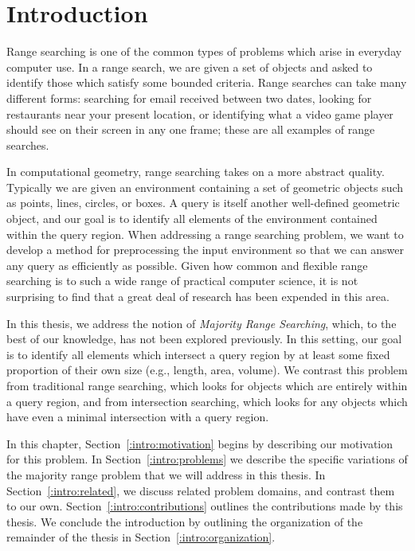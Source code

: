 \chapter{Introduction}
\label{:intro}


Range searching is one of the common types of problems which arise in everyday computer use. In a range search, we are given a set of objects and asked to identify those which satisfy some bounded criteria. Range searches can take many different forms: searching for email received between two dates, looking for restaurants near your present location, or identifying what a video game player should see on their screen in any one frame; these are all examples of range searches.

In computational geometry, range searching takes on a more abstract quality. 
Typically we are given an environment containing a set of geometric objects such as points, lines, circles, or boxes. 
A query is itself another well-defined geometric object, and our goal is to identify all elements of the environment contained within the query region.  
When addressing a range searching problem, we want to develop a method for preprocessing the input environment so that we can answer any query as efficiently as possible.
Given how common and flexible range searching is to such a wide range of practical computer science, it is not surprising to  find that a great deal of research has been expended in this area.  

In this thesis, we address the notion of \emph{Majority Range Searching}, which, to the best of our knowledge, has not been explored previously. In this setting, our goal is to identify all elements which intersect a query region by at least some fixed proportion of their own size (e.g., length, area, volume).  We contrast this problem from traditional range searching, which looks for objects which are entirely within a query region, and from intersection searching, which looks for any objects which have even a minimal intersection with a query region.

In this chapter, Section~\ref{:intro:motivation} begins by describing our motivation for this problem. In Section~\ref{:intro:problems} we describe the specific variations of the majority range problem that we will address in this thesis. In Section~\ref{:intro:related}, we discuss related problem domains, and contrast them to our own. Section~\ref{:intro:contributions} outlines the contributions made by this thesis.  We conclude the introduction by outlining the organization of the remainder of the thesis in Section~\ref{:intro:organization}.

